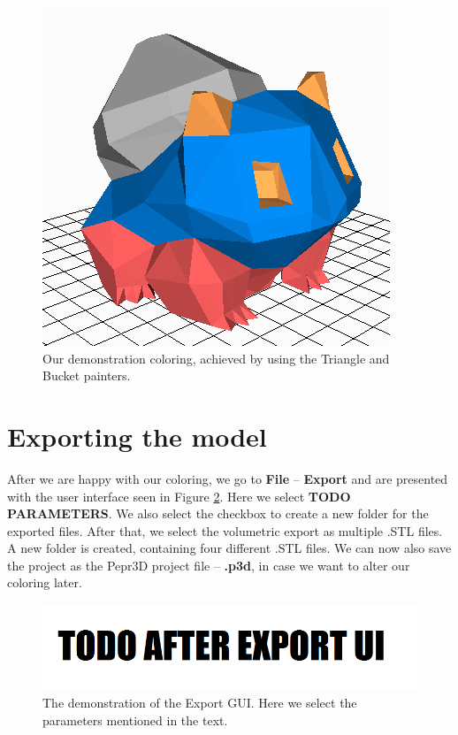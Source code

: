 \begin{figure}
	\centering
	\includegraphics[scale=1]{images/result.png}
	\caption{Our demonstration coloring, achieved by using the Triangle and Bucket painters.}
	\label{fig:painted}
\end{figure}

\section{Exporting the model}

After we are happy with our coloring, we go to \textbf{File} -- \textbf{Export} and are presented with the user interface seen in Figure \ref{fig:exportui}. Here we select \textbf{TODO PARAMETERS}. We also select the checkbox to create a new folder for the exported files. After that, we select the volumetric export as multiple .STL files. A new folder is created, containing four different .STL files. We can now also save the project as the Pepr3D project file -- \textbf{.p3d}, in case we want to alter our coloring later.

\begin{figure}
	\centering
	\includegraphics[scale=0.7]{images/export_ui.png}
	\caption{The demonstration of the Export GUI. Here we select the parameters mentioned in the text.}
	\label{fig:exportui}
\end{figure}

